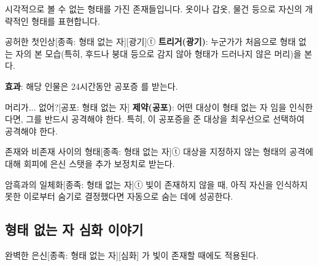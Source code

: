 \documentclass{report}
\begin{document}
	시각적으로 볼 수 없는 형태를 가진 존재들입니다. 옷이나 갑옷, 물건 등으로 자신의 개략적인 형태를 표현합니다.
	
	\begin{story}{공허한 첫인상}{[종족: 형태 없는 자][광기]ⓣ}
		\textbf{트리거(광기)}: 누군가가 처음으로 형태 없는 자의 본 모습(특히, 후드나 붕대 등으로 감지 않아 형태가 드러나지 않은 머리)을 본다.
		
		\textbf{효과}: 해당 인물은 24시간동안 공포증 를 받는다.
		
	\end{story}
	
	\begin{story}{머리가... 없어?}{[공포: 형태 없는 자]}
		\textbf{제약(공포)}: 어떤 대상이 형태 없는 자 임을 인식한다면, 그를 반드시 공격해야 한다. 특히, 이 공포증을 준 대상을 최우선으로 선택하여 공격해야 한다.
		
	\end{story}
	
	\begin{story}{존재와 비존재 사이의 형태}{[종족: 형태 없는 자]ⓣ}
		대상을 지정하지 않는 형태의 공격에 대해 회피에 은신 스탯을 추가 보정치로 받는다.
		
	\end{story}
	
	\begin{story}{암흑과의 일체화}{[종족: 형태 없는 자]ⓣ}
		빛이 존재하지 않을 때, 아직 자신을 인식하지 못한 이로부터 숨기로 결정했다면 자동으로 숨는 데에 성공한다.
		
	\end{story}
	
	\subsection{형태 없는 자 심화 이야기}
	
	\begin{story}{완벽한 은신}{[종족: 형태 없는 자][심화]}
		가 빛이 존재할 때에도 적용된다.
		
	\end{story}
\end{document}
